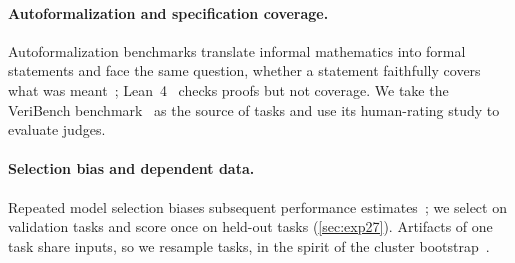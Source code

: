 \paragraph{Autoformalization and specification coverage.}
Autoformalization benchmarks translate informal mathematics into formal statements and face the same question, whether a statement faithfully covers what was meant~\citep{wu2022autoformalization,azerbayev2023proofnet,zheng2022minif2f}; Lean~4~\citep{moura2021lean4} checks proofs but not coverage.
We take the VeriBench benchmark~\citep{veribench2026} as the source of tasks and use its human-rating study to evaluate judges.

\paragraph{Selection bias and dependent data.}
Repeated model selection biases subsequent performance estimates~\citep{cawley2010overfitting}; we select on validation tasks and score once on held-out tasks (\cref{sec:exp27}).
Artifacts of one task share inputs, so we resample tasks, in the spirit of the cluster bootstrap~\citep{field2007bootstrapping}.

